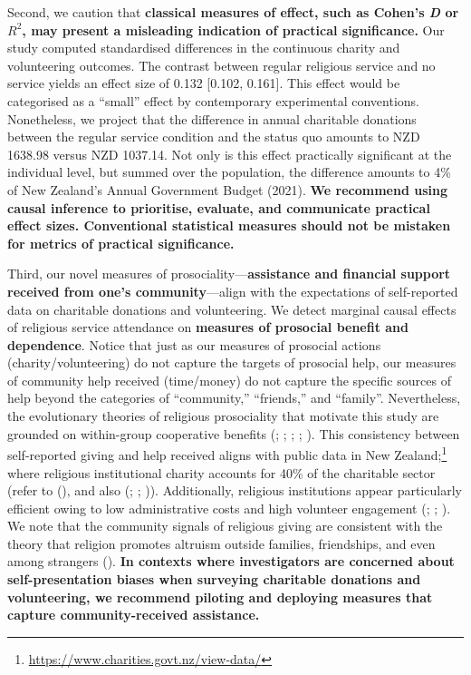 \documentclass[
  single column]{article}
\begin{document}
Second, we caution that \textbf{classical measures of effect, such as
Cohen's \emph{D} or \(R^2\), may present a misleading indication of
practical significance.} Our study computed standardised differences in
the continuous charity and volunteering outcomes. The contrast between
regular religious service and no service yields an effect size of 0.132
{[}0.102, 0.161{]}. This effect would be categorised as a ``small''
effect by contemporary experimental conventions. Nonetheless, we project
that the difference in annual charitable donations between the regular
service condition and the status quo amounts to NZD 1638.98 versus NZD
1037.14. Not only is this effect practically significant at the
individual level, but summed over the population, the difference amounts
to 4\% of New Zealand's Annual Government Budget (2021). \textbf{We
recommend using causal inference to prioritise, evaluate, and
communicate practical effect sizes. Conventional statistical measures
should not be mistaken for metrics of practical significance.}

Third, our novel measures of prosociality---\textbf{assistance and
financial support received from one's community}---align with the
expectations of self-reported data on charitable donations and
volunteering. We detect marginal causal effects of religious service
attendance on \textbf{measures of prosocial benefit and dependence}.
Notice that just as our measures of prosocial actions
(charity/volunteering) do not capture the targets of prosocial help, our
measures of community help received (time/money) do not capture the
specific sources of help beyond the categories of ``community,''
``friends,'' and ``family''. Nevertheless, the evolutionary theories of
religious prosociality that motivate this study are grounded on
within-group cooperative benefits
(;
;
;
;
). This
consistency between self-reported giving and help received aligns with
public data in New Zealand;\footnote{\url{https://www.charities.govt.nz/view-data/}}
where religious institutional charity accounts for 40\% of the
charitable sector (refer to (), and also (;
;
)).
Additionally, religious institutions appear particularly efficient owing
to low administrative costs and high volunteer engagement
(;
;
). We note that the
community signals of religious giving are consistent with the theory
that religion promotes altruism outside families, friendships, and even
among strangers (). \textbf{In contexts where investigators are concerned about
self-presentation biases when surveying charitable donations and
volunteering, we recommend piloting and deploying measures that capture
community-received assistance.}
\end{document}
